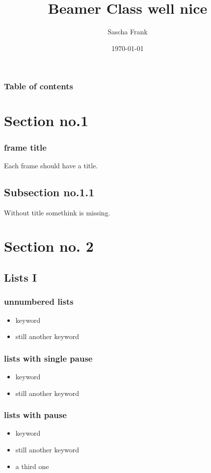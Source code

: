 \documentclass[hyperref={pdfpagelabels=false}]{beamer}
\title{Beamer Class well nice}
\author{Sascha Frank}
\date{\today}
\begin{document}
\begin{frame}
\titlepage
\end{frame} 

\begin{frame}
\frametitle{Table of contents}
\tableofcontents
\end{frame}
 


\section{Section no.1} 
\begin{frame}
\frametitle{frame title} 
Each frame should have a title.
\end{frame}

\subsection{Subsection no.1.1  }
\begin{frame}
Without title somethink is missing. 
\end{frame}


\section{Section no. 2} 
\subsection{Lists I}
\begin{frame}
\frametitle{unnumbered lists}
\begin{itemize}
\item keyword
\item still another keyword
\end{itemize} 
\end{frame}

\begin{frame}
\frametitle{lists with single pause}
\begin{itemize}
\item keyword  \pause 
\item still another keyword
\end{itemize} 
\end{frame}

\begin{frame}
\frametitle{lists with pause}
\begin{itemize}[<+->]
\item keyword  
\item still another keyword
\item a third one 
\end{itemize} 
\end{frame}
\end{document}
